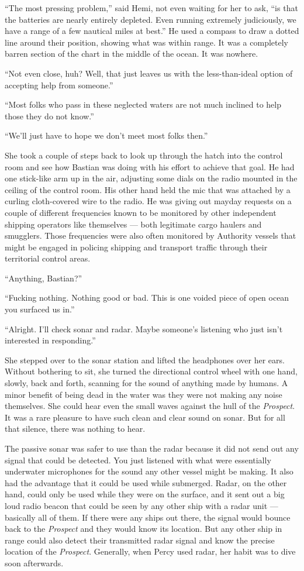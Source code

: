 \documentclass[
]{scrbook}
\begin{document}
``The most pressing problem,'' said Hemi, not even waiting for her to
ask, ``is that the batteries are nearly entirely depleted. Even running
extremely judiciously, we have a range of a few nautical miles at
best.'' He used a compass to draw a dotted line around their position,
showing what was within range. It was a completely barren section of the
chart in the middle of the ocean. It was nowhere.

``Not even close, huh? Well, that just leaves us with the
less-than-ideal option of accepting help from someone.''

``Most folks who pass in these neglected waters are not much inclined to
help those they do not know.''

``We'll just have to hope we don't meet most folks then.''

She took a couple of steps back to look up through the hatch into the
control room and see how Bastian was doing with his effort to achieve
that goal. He had one stick-like arm up in the air, adjusting some dials
on the radio mounted in the ceiling of the control room. His other hand
held the mic that was attached by a curling cloth-covered wire to the
radio. He was giving out mayday requests on a couple of different
frequencies known to be monitored by other independent shipping
operators like themselves --- both legitimate cargo haulers and
smugglers. Those frequencies were also often monitored by Authority
vessels that might be engaged in policing shipping and transport traffic
through their territorial control areas.

``Anything, Bastian?''

``Fucking nothing. Nothing good or bad. This is one voided piece of open
ocean you surfaced us in.''

``Alright. I'll check sonar and radar. Maybe someone's listening who
just isn't interested in responding.''

She stepped over to the sonar station and lifted the headphones over her
ears. Without bothering to sit, she turned the directional control wheel
with one hand, slowly, back and forth, scanning for the sound of
anything made by humans. A minor benefit of being dead in the water was
they were not making any noise themselves. She could hear even the small
waves against the hull of the \emph{Prospect}. It was a rare pleasure to
have such clean and clear sound on sonar. But for all that silence,
there was nothing to hear.

The passive sonar was safer to use than the radar because it did not
send out any signal that could be detected. You just listened with what
were essentially underwater microphones for the sound any other vessel
might be making. It also had the advantage that it could be used while
submerged. Radar, on the other hand, could only be used while they were
on the surface, and it sent out a big loud radio beacon that could be
seen by any other ship with a radar unit --- basically all of them. If
there were any ships out there, the signal would bounce back to the
\emph{Prospect} and they would know its location. But any other ship in
range could also detect their transmitted radar signal and know the
precise location of the \emph{Prospect}. Generally, when Percy used
radar, her habit was to dive soon afterwards.
\end{document}
